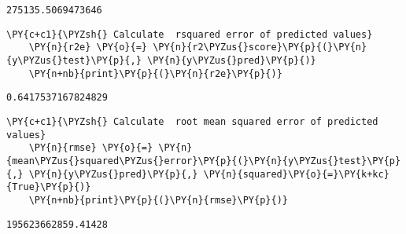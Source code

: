         \begin{Verbatim}[commandchars=\\\{\}]
    275135.5069473646
        \end{Verbatim}
    
        \begin{tcolorbox}[breakable, size=fbox, boxrule=1pt, pad at break*=1mm,colback=cellbackground, colframe=cellborder]
    \begin{Verbatim}[commandchars=\\\{\}]
    \PY{c+c1}{\PYZsh{} Calculate  rsquared error of predicted values}
    \PY{n}{r2e} \PY{o}{=} \PY{n}{r2\PYZus{}score}\PY{p}{(}\PY{n}{y\PYZus{}test}\PY{p}{,} \PY{n}{y\PYZus{}pred}\PY{p}{)}
    \PY{n+nb}{print}\PY{p}{(}\PY{n}{r2e}\PY{p}{)}
    \end{Verbatim}
    \end{tcolorbox}
    
        \begin{Verbatim}[commandchars=\\\{\}]
    0.6417537167824829
        \end{Verbatim}
    
        \begin{tcolorbox}[breakable, size=fbox, boxrule=1pt, pad at break*=1mm,colback=cellbackground, colframe=cellborder]
    \begin{Verbatim}[commandchars=\\\{\}]
    \PY{c+c1}{\PYZsh{} Calculate  root mean squared error of predicted values}
    \PY{n}{rmse} \PY{o}{=} \PY{n}{mean\PYZus{}squared\PYZus{}error}\PY{p}{(}\PY{n}{y\PYZus{}test}\PY{p}{,} \PY{n}{y\PYZus{}pred}\PY{p}{,} \PY{n}{squared}\PY{o}{=}\PY{k+kc}{True}\PY{p}{)}
    \PY{n+nb}{print}\PY{p}{(}\PY{n}{rmse}\PY{p}{)}
    \end{Verbatim}
    \end{tcolorbox}
    
        \begin{Verbatim}[commandchars=\\\{\}]
    195623662859.41428
        \end{Verbatim}
    
